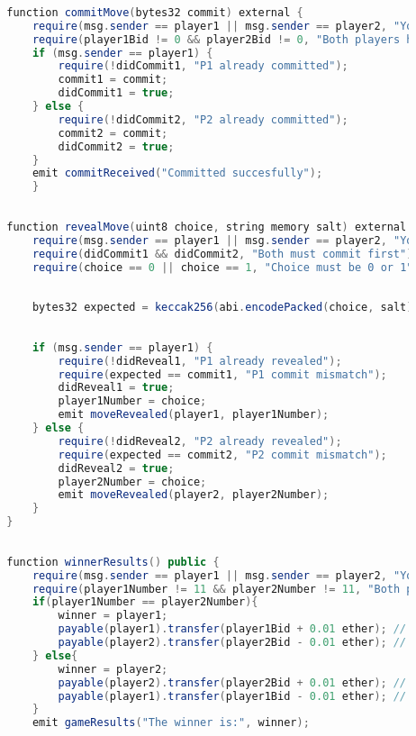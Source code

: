 \documentclass[12pt]{article}
\begin{document}
\begin{lstlisting}[language=Java]
    
        function commitMove(bytes32 commit) external {
            require(msg.sender == player1 || msg.sender == player2, "You are not a player");
            require(player1Bid != 0 && player2Bid != 0, "Both players have to make a bid");
            if (msg.sender == player1) {
                require(!didCommit1, "P1 already committed");
                commit1 = commit;
                didCommit1 = true;
            } else {
                require(!didCommit2, "P2 already committed");
                commit2 = commit;
                didCommit2 = true;
            }
            emit commitReceived("Committed succesfully");
            }
    
    
        function revealMove(uint8 choice, string memory salt) external {
            require(msg.sender == player1 || msg.sender == player2, "You are not a player");
            require(didCommit1 && didCommit2, "Both must commit first");
            require(choice == 0 || choice == 1, "Choice must be 0 or 1");
    
    
            bytes32 expected = keccak256(abi.encodePacked(choice, salt));
    
    
            if (msg.sender == player1) {
                require(!didReveal1, "P1 already revealed");
                require(expected == commit1, "P1 commit mismatch");
                didReveal1 = true;
                player1Number = choice;
                emit moveRevealed(player1, player1Number);
            } else {
                require(!didReveal2, "P2 already revealed");
                require(expected == commit2, "P2 commit mismatch");
                didReveal2 = true;
                player2Number = choice;
                emit moveRevealed(player2, player2Number);
            }
        }
    
    
        function winnerResults() public {
            require(msg.sender == player1 || msg.sender == player2, "You are not a player");
            require(player1Number != 11 && player2Number != 11, "Both players have to reveal their number");
            if(player1Number == player2Number){
                winner = player1;
                payable(player1).transfer(player1Bid + 0.01 ether); // 0.6 ether
                payable(player2).transfer(player2Bid - 0.01 ether); // 0.4 ether
            } else{
                winner = player2;
                payable(player2).transfer(player2Bid + 0.01 ether); // 0.6 ether
                payable(player1).transfer(player1Bid - 0.01 ether); // 0.4 ether
            }
            emit gameResults("The winner is:", winner);
    

\end{lstlisting}
\end{document}
